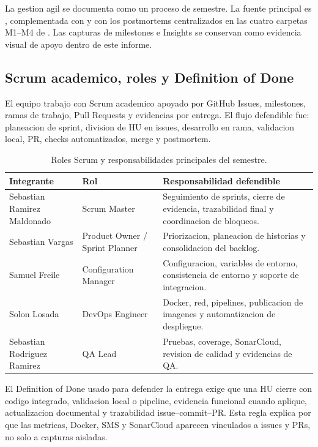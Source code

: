 \documentclass[11pt,a4paper]{article}
\begin{document}
La gestion agil se documenta como un proceso de semestre. La fuente principal es , complementada con  y con los postmortems centralizados en las cuatro carpetas M1--M4 de . Las capturas de milestones e Insights se conservan como evidencia visual de apoyo dentro de este informe.

\subsection{Scrum academico, roles y Definition of Done}

El equipo trabajo con Scrum academico apoyado por GitHub Issues, milestones, ramas de trabajo, Pull Requests y evidencias por entrega. El flujo defendible fue: planeacion de sprint, division de HU en issues, desarrollo en rama, validacion local, PR, checks automatizados, merge y postmortem.

\begin{table}[H]
\centering
\small
\begin{tabularx}{\linewidth}{P{4cm}P{3.2cm}Y}
\toprule
\textbf{Integrante} & \textbf{Rol} & \textbf{Responsabilidad defendible} \\
\midrule
Sebastian Ramirez Maldonado & Scrum Master & Seguimiento de sprints, cierre de evidencia, trazabilidad final y coordinacion de bloqueos. \\
Sebastian Vargas & Product Owner / Sprint Planner & Priorizacion, planeacion de historias y consolidacion del backlog. \\
Samuel Freile & Configuration Manager & Configuracion, variables de entorno, consistencia de entorno y soporte de integracion. \\
Solon Losada & DevOps Engineer & Docker, red, pipelines, publicacion de imagenes y automatizacion de despliegue. \\
Sebastian Rodriguez Ramirez & QA Lead & Pruebas, coverage, SonarCloud, revision de calidad y evidencias de QA. \\
\bottomrule
\end{tabularx}
\caption{Roles Scrum y responsabilidades principales del semestre.}
\end{table}

El Definition of Done usado para defender la entrega exige que una HU cierre con codigo integrado, validacion local o pipeline, evidencia funcional cuando aplique, actualizacion documental y trazabilidad issue--commit--PR. Esta regla explica por que las metricas, Docker, SMS y SonarCloud aparecen vinculados a issues y PRs, no solo a capturas aisladas.
\end{document}
